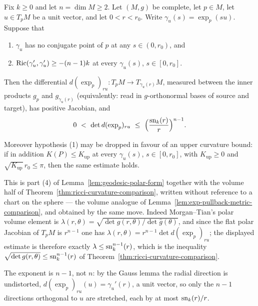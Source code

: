 \begin{lemma}
\label{lem:exp-pullback-volume-comparison}





Fix $k\ge0$ and let $n=\dim M\ge2$. Let $(M,g)$ be complete, let $p\in M$, let
$u\in T_pM$ be a unit vector, and let $0<r<r_0$. Write
$\gamma_u(s)=\exp_p(su)$. Suppose that
\begin{enumerate}
\item $\gamma_u$ has no conjugate point of $p$ at any $s\in(0,r_0)$, and
\item $\operatorname{Ric}(\gamma_u',\gamma_u')\ge-(n-1)k$ at every $\gamma_u(s)$,
$s\in[0,r_0]$.
\end{enumerate}
Then the differential $d(\exp_p)_{ru}\colon T_pM\to T_{\gamma_u(r)}M$, measured
between the inner products $g_p$ and $g_{\gamma_u(r)}$ (equivalently: read in
$g$-orthonormal bases of source and target), has positive Jacobian, and
$$0\ <\ \det d(\exp_p)_{ru}\ \le\ \Bigl(\frac{\sn_{k}(r)}{r}\Bigr)^{n-1}.$$

Moreover hypothesis (1) may be dropped in favour of an upper curvature bound: if
in addition $K(P)\le K_{\mathrm{up}}$ at every $\gamma_u(s)$, $s\in[0,r_0]$, with
$K_{\mathrm{up}}\ge0$ and $\sqrt{K_{\mathrm{up}}}\,r_0\le\pi$, then the same
estimate holds.
\end{lemma}

This is part (4) of Lemma~\ref{lem:geodesic-polar-form} together with the volume
half of Theorem~\ref{thm:ricci-curvature-comparison}, written without reference
to a chart on the sphere --- the volume analogue of
Lemma~\ref{lem:exp-pullback-metric-comparison}, and obtained by the same move.
Indeed Morgan--Tian's polar volume element is
$\lambda(r,\theta)=\sqrt{\det g(r,\theta)/\det\hat g(\theta)}$, and since the
flat polar Jacobian of $T_pM$ is $r^{n-1}$ one has
$\lambda(r,\theta)=r^{n-1}\det d(\exp_p)_{ru}$; the displayed estimate is
therefore exactly $\lambda\le\operatorname{sn}_k^{n-1}(r)$, which is the inequality
$\sqrt{\det g(r,\theta)}\le\operatorname{sn}_k^{n-1}(r)$ of
Theorem~\ref{thm:ricci-curvature-comparison}.

The exponent is $n-1$, not $n$: by the Gauss lemma the radial direction is
undistorted, $d(\exp_p)_{ru}(u)=\gamma_u'(r)$, a unit vector, so only the $n-1$
directions orthogonal to $u$ are stretched, each by at most $\operatorname{sn}_k(r)/r$.

